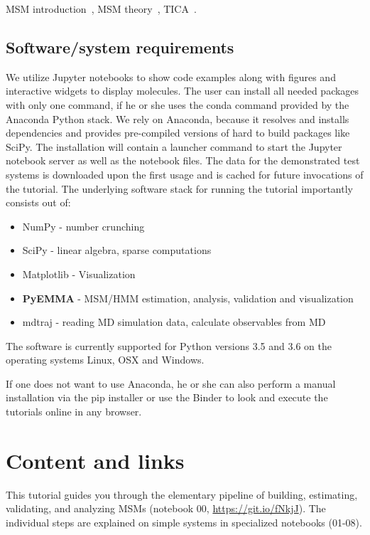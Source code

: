 \documentclass[9pt,tutorial]{livecoms}
\begin{document}
MSM introduction~\cite{msm-brooke}, MSM theory~\cite{msm-jhp,msm-book}, TICA~\cite{tica,tica3,tica2}.

\subsection{Software/system requirements}

We utilize Jupyter notebooks to show code examples along with figures and interactive widgets to display molecules. The user can install all needed packages with only one command, if he or she uses the conda command provided by the Anaconda Python stack. We rely on Anaconda, because it resolves and installs dependencies and provides pre-compiled versions of hard to build packages like SciPy. The installation will contain a launcher command to start the Jupyter notebook server as well as the notebook files. The data for the demonstrated test systems is downloaded upon the first usage and is cached for future invocations of the tutorial. The underlying software stack for running the tutorial importantly consists out of:
\begin{itemize}
 \item NumPy - number crunching
 \item SciPy - linear algebra, sparse computations
 \item Matplotlib - Visualization
 \item \textbf{PyEMMA} - MSM/HMM estimation, analysis, validation and visualization
 \item mdtraj - reading MD simulation data, calculate observables from MD
\end{itemize}

The software is currently supported for Python versions 3.5 and 3.6 on the operating systems Linux, OSX and Windows.

If one does not want to use Anaconda, he or she can also perform a manual installation via the pip installer or use the Binder to look and execute the tutorials online in any browser.


\section{Content and links}



This tutorial guides you through the elementary pipeline of building, estimating, validating, and analyzing MSMs (notebook 00, \url{https://git.io/fNkjJ}). The individual steps are explained on simple systems in specialized notebooks (01-08).
\end{document}
